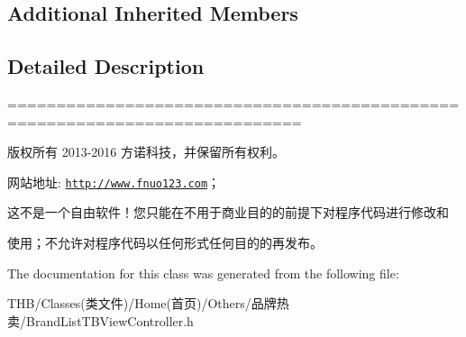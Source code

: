 \subsection*{Additional Inherited Members}


\subsection{Detailed Description}
============================================================================

版权所有 2013-\/2016 方诺科技，并保留所有权利。

网站地址\+: \href{http://www.fnuo123.com}{\tt http\+://www.\+fnuo123.\+com}； 



这不是一个自由软件！您只能在不用于商业目的的前提下对程序代码进行修改和

使用；不允许对程序代码以任何形式任何目的的再发布。 

 

The documentation for this class was generated from the following file\+:\begin{DoxyCompactItemize}
\item 
T\+H\+B/\+Classes(类文件)/\+Home(首页)/\+Others/品牌热卖/Brand\+List\+T\+B\+View\+Controller.\+h\end{DoxyCompactItemize}
